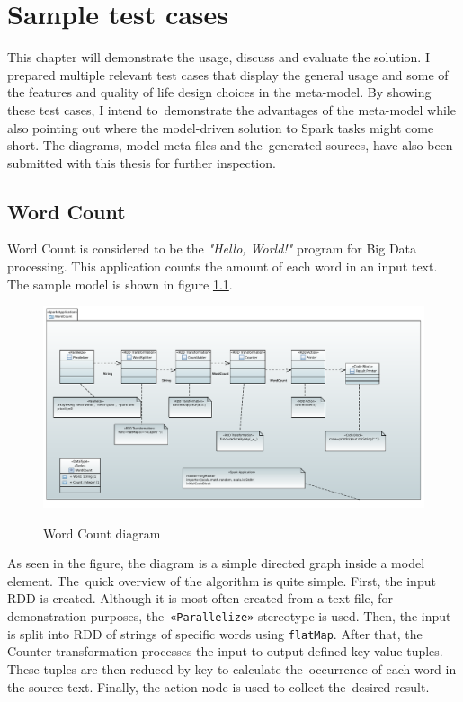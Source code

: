 \chapter{Sample test cases}
\label{chap:testing}
This chapter will demonstrate the usage, discuss and evaluate the solution. I prepared multiple relevant test cases that display the general usage and some of the features and quality of life design choices in the meta-model. By showing these test cases, I intend to~demonstrate the advantages of the meta-model while also pointing out where the model-driven solution to Spark tasks might come short. The diagrams, model meta-files and the~generated sources, have also been submitted with this thesis for further inspection.  


\section{Word Count}

Word Count is considered to be the \textit{"Hello, World!"} program for Big Data processing. This application counts the amount of each word in an input text. The sample model is shown in figure \ref{fig:wordcount}. 


\begin{figure}[H]
\centering
\includegraphics[width=1\textwidth]{obrazky-figures/word-count-diagram.pdf}
\label{fig:wordcount}
\caption{Word Count diagram}
\end{figure}

As seen in the figure, the diagram is a simple directed graph inside a model element. The~quick overview of the algorithm is quite simple. First, the input RDD is created. Although it is most often created from a text file, for demonstration purposes, the~\texttt{«Parallelize»} stereotype is used. Then, the input is split into RDD of strings of specific words using \texttt{flatMap}. After that, the Counter transformation processes the input to output defined key-value tuples. These tuples are then reduced by key to calculate the~occurrence of each word in the source text. Finally, the action node is used to collect the~desired result.

